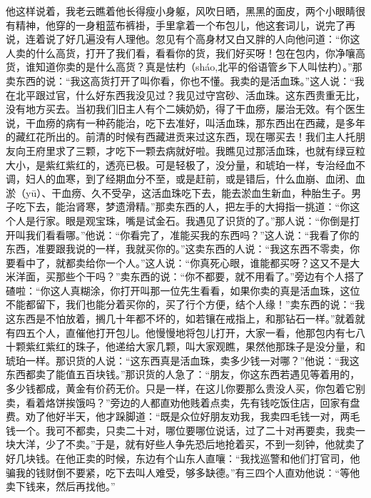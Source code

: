 \documentclass[12pt,UTF8]{ctexbook}
\begin{document}
他这样说着，我老云瞧着他长得瘦小身躯，风吹日晒，黑黑的面皮，两个小眼睛很有精神，他穿的一身粗蓝布裤褂，手里拿着一个布包儿，他这套词儿，说完了再说，连着说了好几遍没有人理他。忽见有个高身材又白又胖的人向他问道：“你这人卖的什么高货，打开了我们看，看看你的货，我们好买呀！包在包内，你净嚷高货，谁知道你卖的是什么高货？真是怯杓（sháo,北平的俗语管乡下人叫怯杓）。”那卖东西的说：“我这高货打开了叫你看，你也不懂。我卖的是活血珠。”这人说：“我在北平跟过官，什么好东西我没见过？我见过守宫砂、活血珠。这东西贵重无比，没有地方买去。当初我们旧主人有个二姨奶奶，得了干血痨，屡治无效。有个医生说，干血痨的病有一种药能治，吃下去准好，叫活血珠，那东西出在西藏，是多年的藏红花所出的。前清的时候有西藏进贡来过这东西，现在哪买去！我们主人托朋友向王府里求了三颗，才吃下一颗去病就好啦。我瞧见过那活血珠，也就有绿豆粒大小，是紫红紫红的，透亮已极。可是轻极了，没分量，和琥珀一样，专治经血不调，妇人的血寒，到了经期血分不至，或是赶前，或是错后，什么血崩、血闭、血淤（yū）、干血痨、久不受孕，这活血珠吃下去，能去淤血生新血，种胎生子。男子吃下去，能治肾寒，梦遗滑精。”那卖东西的人，把左手的大拇指一挑道：“你这个人是行家。眼是观宝珠，嘴是试金石。我遇见了识货的了。”那人说：“你倒是打开叫我们看看哪。”他说：“你看完了，准能买我的东西吗？”这人说：“我看了你的东西，准要跟我说的一样，我就买你的。”这卖东西的人说：“我这东西不零卖，你要看中了，就都卖给你一个人。”这人说：“你真死心眼，谁能都买呀？这又不是大米洋面，买那些个干吗？”卖东西的说：“你不都要，就不用看了。”旁边有个人搭了碴啦：“你这人真糊涂，你打开叫那一位先生看看，如果你卖的真是活血珠，这位不能都留下，我们也能分着买你的，买了行个方便，结个人缘！”卖东西的说：“我这东西是不怕放着，搁几十年都不坏的，如若镶在戒指上，和那钻石一样。”就着就有四五个人，直催他打开包儿。他慢慢地将包儿打开，大家一看，他那包内有七八十颗紫红紫红的珠子，他递给大家几颗，叫大家观瞧，果然他那珠子是没分量，和琥珀一样。那识货的人说：“这东西真是活血珠，卖多少钱一对哪？”他说：“我这东西都卖了能值五百块钱。”那识货的人急了：“朋友，你这东西若遇见等着用的，多少钱都成，黄金有价药无价。只是一样，在这儿你要那么贵没人买，你包着它别卖，看着烙饼挨饿吗？”旁边的人都直劝他贱着点卖，先有钱吃饭住店，回家有盘费。劝了他好半天，他才跺脚道：“既是众位好朋友劝我，我卖四毛钱一对，两毛钱一个。我可不都卖，只卖二十对，哪位要哪位说话，过了二十对再要卖，我卖一块大洋，少了不卖。”于是，就有好些人争先恐后地抢着买，不到一刻钟，他就卖了好几块钱。在他正卖的时候，东边有个山东人直嚷：“我找巡警和他们打官司，他骗我的钱财倒不要紧，吃下去叫人难受，够多缺德。”有三四个人直劝他说：“等他卖下钱来，然后再找他。”
\end{document}
